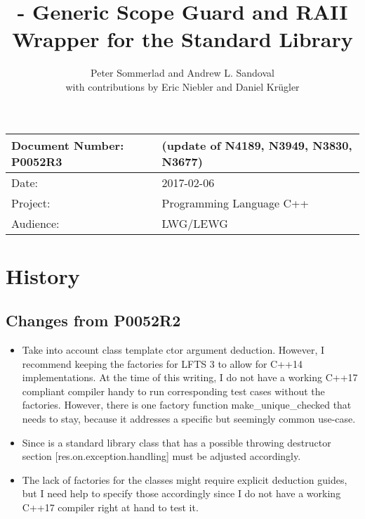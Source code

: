\documentclass[ebook,11pt,article]{memoir}
\title{\papernumber{} - Generic Scope Guard and RAII Wrapper for the Standard Library}
\author{Peter Sommerlad and Andrew L. Sandoval\\with contributions by Eric Niebler and Daniel Kr\"ugler}
\date{\paperdate}                        %
\newcommand{\papernumber}{P0052R3}
\newcommand{\paperdate}{2017-02-06}
\begin{document}
\maketitle
\begin{tabular}[t]{|l|l|}\hline 
Document Number: \papernumber &   (update of N4189, N3949, N3830, N3677)\\\hline
Date: & \paperdate \\\hline
Project: & Programming Language C++\\\hline 
Audience: & LWG/LEWG\\\hline
\end{tabular}

\chapter{History}
\section{Changes from P0052R2}
\begin{itemize}
\item Take into account class template ctor argument deduction. However, I recommend keeping the factories for LFTS 3 to allow for C++14 implementations. At the time of this writing, I do not have a working C++17 compliant compiler handy to run corresponding test cases without the factories. However, there is one factory function make_unique_checked that needs to stay, because it addresses a specific but seemingly common use-case.
\item Since  is a standard library class that has a possible throwing destructor section [res.on.exception.handling] must be adjusted accordingly.
\item The lack of factories for the classes might require explicit deduction guides, but I need help to specify those accordingly since I do not have a working C++17 compiler right at hand to test it.
\end{itemize}
\end{document}
